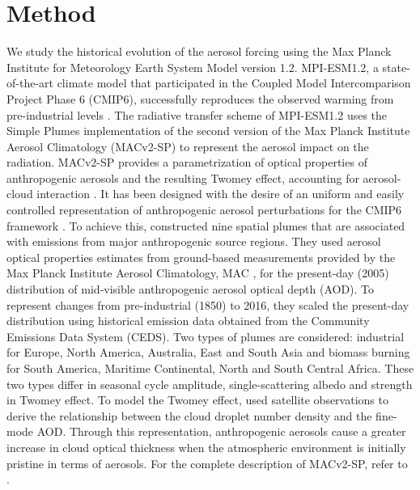 \documentclass[draft]{agujournal2019}
\begin{document}
\section{Method}\label{sec:method}
      We study the historical evolution of the aerosol forcing using the Max Planck Institute for Meteorology Earth System Model version 1.2. MPI-ESM1.2, a state-of-the-art climate model \cite{Mauritsen_2019} that participated in the Coupled Model Intercomparison Project Phase 6 (CMIP6), successfully reproduces the observed warming from pre-industrial levels \cite{Mauritsen_2020}.
      The radiative transfer scheme of MPI-ESM1.2 uses the Simple Plumes implementation of the second version of the Max Planck Institute Aerosol Climatology (MACv2-SP) to represent the aerosol impact on the radiation. MACv2-SP provides a parametrization of optical properties of anthropogenic aerosols and the resulting Twomey effect, accounting for aerosol-cloud interaction \cite{Stevens_2017}. It has been designed with the desire of an uniform and easily controlled representation of anthropogenic aerosol perturbations for the CMIP6 framework \cite{Eyring_2016,Pincus_2016}. To achieve this,  constructed nine spatial plumes that are associated with emissions from major anthropogenic source regions. They used aerosol optical properties estimates from ground-based measurements provided by the Max Planck Institute Aerosol Climatology, MAC \cite{Kinne_2013}, for the present-day (2005) distribution of mid-visible anthropogenic aerosol optical depth (AOD). 
      To represent changes from pre-industrial (1850) to 2016, they scaled the present-day distribution using historical emission data obtained from the Community Emissions Data System (CEDS). Two types of plumes are considered: industrial for Europe, North America, Australia, East and South Asia and biomass burning for South America, Maritime Continental, North and South Central Africa. These two types differ in seasonal cycle amplitude, single-scattering albedo and strength in Twomey effect. 
      To model the Twomey effect,  used satellite observations to derive the relationship between the cloud droplet number density and the fine-mode AOD. Through this representation, anthropogenic aerosols cause a greater increase in cloud optical thickness when the atmospheric environment is initially pristine in terms of aerosols. For the complete description of MACv2-SP, refer to .
\end{document}

